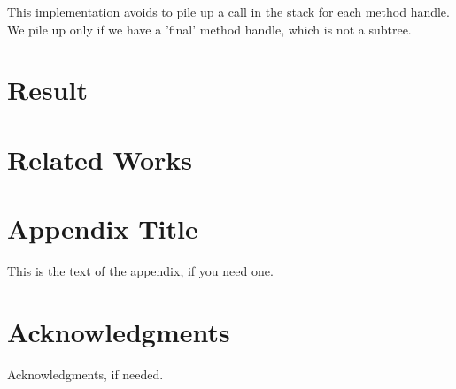 \documentclass{sig-alternate}
\begin{document}
        
    
        This implementation avoids to pile up a call in the stack for each method handle.
        We pile up only if we have a 'final' method handle, which is not a subtree.

\section{Result}

\section{Related Works}

\appendix
\section{Appendix Title}

This is the text of the appendix, if you need one.

\section{Acknowledgments}

Acknowledgments, if needed.


\makeatletter
  \def\@seccntformat#1{Appendix~\csname the#1\endcsname:\quad}
\makeatother

% 

\end{document}
